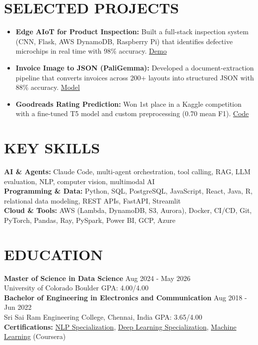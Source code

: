 \documentclass[a4paper,11pt]{letter}
\newcommand{\lnk}[2]{{\small\href{#1}{\textcolor{secondary}{#2}}}}
\begin{document}
\section{SELECTED PROJECTS}
\begin{itemize}
\item \textbf{Edge AIoT for Product Inspection:} Built a full-stack inspection system (CNN, Flask, AWS DynamoDB, Raspberry Pi) that identifies defective microchips in real time with 98\% accuracy. \hfill \lnk{https://www.youtube.com/watch?v=mOJEEJ-eYmM}{Demo}
\item \textbf{Invoice Image to JSON (PaliGemma):} Developed a document-extraction pipeline that converts invoices across 200+ layouts into structured JSON with 88\% accuracy. \hfill \lnk{https://huggingface.co/Arsive/paligemma-img-to-json}{Model}
\item \textbf{Goodreads Rating Prediction:} Won 1st place in a Kaggle competition with a fine-tuned T5 model and custom preprocessing (0.70 mean F1). \hfill \lnk{https://github.com/Arsive02/Goodreads_Books_Review_Rating_Prediction}{Code}
\end{itemize}

\section{KEY SKILLS}
\textbf{AI \& Agents:} Claude Code, multi-agent orchestration, tool calling, RAG, LLM evaluation, NLP, computer vision, multimodal AI\\
\textbf{Programming \& Data:} Python, SQL, PostgreSQL, JavaScript, React, Java, R, relational data modeling, REST APIs, FastAPI, Streamlit\\
\textbf{Cloud \& Tools:} AWS (Lambda, DynamoDB, S3, Aurora), Docker, CI/CD, Git, PyTorch, Pandas, Ray, PySpark, Power BI, GCP, Azure

\section{EDUCATION}
\textbf{Master of Science in Data Science} \hfill Aug 2024 - May 2026\\
University of Colorado Boulder \hfill GPA: 4.00/4.00\\
\textbf{Bachelor of Engineering in Electronics and Communication} \hfill Aug 2018 - Jun 2022\\
Sri Sai Ram Engineering College, Chennai, India \hfill GPA: 3.65/4.00\\
\textbf{Certifications:} \href{https://www.coursera.org/account/accomplishments/specialization/JFDNHB4YM3AR}{\textcolor{secondary}{NLP Specialization}}, \href{https://www.coursera.org/account/accomplishments/specialization/DEVTH7W95X9T}{\textcolor{secondary}{Deep Learning Specialization}}, \href{https://www.coursera.org/account/accomplishments/verify/Q7G4VB62HQBK}{\textcolor{secondary}{Machine Learning}} (Coursera)
\end{document}
